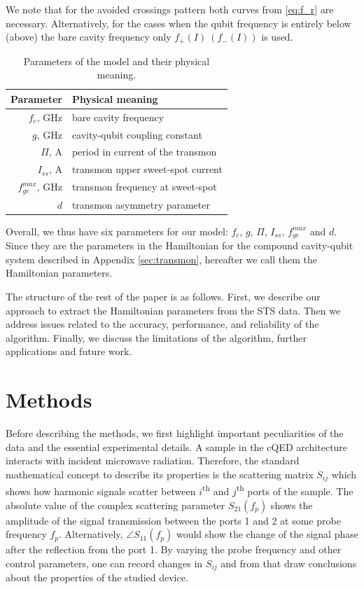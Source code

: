 \documentclass[%
 aip,
 amsmath,amssymb,
 reprint,%
]{revtex4-1}
\begin{document}
We note that for the avoided crossings pattern both curves from \eqref{eq:f_r} are necessary. Alternatively, for the cases when the qubit frequency is entirely below (above) the bare cavity frequency only $ f_+(I)\ \left(f_-(I)\right)$ is used. 
\begin{table}
\begin{ruledtabular}
	\begin{tabular}{rl} 
		Parameter & Physical meaning \\ 
		\hline
		$f_c$, GHz & bare cavity frequency \\ 
		$g$, GHz & cavity-qubit coupling constant \\
		$\Pi$, A & period in current of the transmon \\
		$I_{ss}$, A & transmon upper sweet-spot current \\
		$f_{ge}^{max}$, GHz & transmon frequency at sweet-spot \\
		$d$& transmon asymmetry parameter
	\end{tabular} 
\end{ruledtabular}
\caption{Parameters of the model and their physical meaning.}
\label{tab:pars}
\end{table}
Overall, we thus have six parameters for our model: $f_c$, $g$, $\Pi$, $I_{ss}$, $f_{ge}^{max}$ and $d$. Since they are the parameters in the Hamiltonian for the compound cavity-qubit system described in Appendix \ref{sec:transmon}, hereafter we call them the Hamiltonian parameters.

The structure of the rest of the paper is as follows. First, we describe our approach to extract the Hamiltonian parameters from the STS data. Then we address issues related to the accuracy, performance, and reliability of the algorithm. Finally, we discuss the limitations of the algorithm, further applications and future work. 

\section{Methods}

Before describing the methods, we first highlight important peculiarities of the data and the essential experimental details. A sample in the cQED architecture interacts with incident microwave radiation. Therefore, the standard mathematical concept to describe its properties is the scattering matrix $S_{ij}$ which shows how harmonic signals scatter between $i$\textsuperscript{th} and $j$\textsuperscript{th} ports of the sample. The absolute value of the complex scattering parameter $S_{21}(f_p)$ shows the amplitude of the signal transmission between the ports 1 and 2 at some probe frequency $f_p$. Alternatively, $\angle S_{11}(f_p)$ would show the change of the signal phase after the reflection from the port 1. By varying the probe frequency and other control parameters, one can record changes in $S_{ij}$ and from that draw conclusions about the properties of the studied device.
\end{document}
